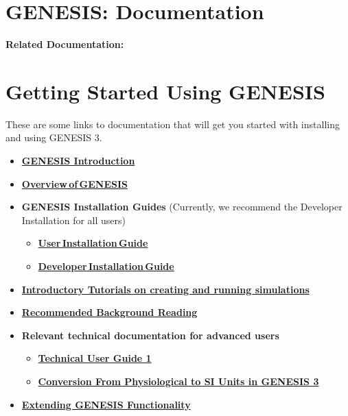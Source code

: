 \documentclass[12pt]{article}
\begin{document}
\section*{GENESIS: Documentation}

{\bf Related Documentation:}

\section*{Getting Started Using GENESIS}

These are some links to documentation that will get you started with
installing and using GENESIS 3.

\begin{itemize}

   \item \href{../genesis-intro/genesis-intro.tex} {\bf GENESIS Introduction}

   \item \href{../genesis-overview/genesis-overview.tex}{\bf Overview\,of\,GENESIS}

    \item {\bf GENESIS Installation Guides} (Currently, we recommend the Developer Installation for all users)

      \begin{itemize}
         \item \href{../installation-debian/installation-debian.tex}{\bf User\,Installation\,Guide}
         \item \href{../developer-installation/developer-installation.tex}{\bf Developer\,Installation\,Guide}
      \end{itemize}

   \item \href{../tutorial-genesis/tutorial-genesis.tex} {\bf Introductory
          Tutorials on creating and running simulations}

   \item \href{../background-material/background-material.tex}
          {\bf Recommended Background Reading}

    \item  {\bf Relevant technical documentation for advanced users}
      \begin{itemize}
         \item \href{../technical-guide-1/technical-guide-1.tex}
                {\bf Technical User Guide 1}
         \item \href{../units-conversion/units-conversion.tex}
                {\bf Conversion From Physiological to SI Units in GENESIS 3}
      \end{itemize}

    \item \href{../genesis-extend-functionality/genesis-extend-functionality.tex}
          {\bf Extending GENESIS Functionality}
\end{itemize}
\end{document}
